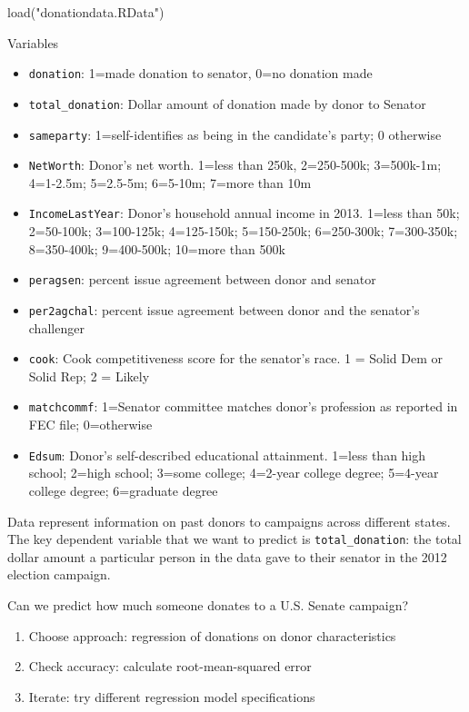 \documentclass[
  letterpaper,
  DIV=11,
  numbers=noendperiod]{scrreprt}
\newenvironment{Shaded}{\begin{snugshade}}{\end{snugshade}}
\newcommand{\FunctionTok}[1]{\textcolor[rgb]{0.28,0.35,0.67}{#1}}
\newcommand{\NormalTok}[1]{\textcolor[rgb]{0.00,0.23,0.31}{#1}}
\newcommand{\StringTok}[1]{\textcolor[rgb]{0.13,0.47,0.30}{#1}}
\providecommand{\tightlist}{%
  \setlength{\itemsep}{0pt}\setlength{\parskip}{0pt}}\usepackage{longtable,booktabs,array}
\begin{document}
\begin{Shaded}
\begin{Highlighting}[]
\FunctionTok{load}\NormalTok{(}\StringTok{"donationdata.RData"}\NormalTok{)}
\end{Highlighting}
\end{Shaded}

Variables

\begin{itemize}
\tightlist
\item
  \texttt{donation}: 1=made donation to senator, 0=no donation made
\item
  \texttt{total\_donation}: Dollar amount of donation made by donor to
  Senator
\item
  \texttt{sameparty}: 1=self-identifies as being in the candidate's
  party; 0 otherwise
\item
  \texttt{NetWorth}: Donor's net worth. 1=less than 250k, 2=250-500k;
  3=500k-1m; 4=1-2.5m; 5=2.5-5m; 6=5-10m; 7=more than 10m
\item
  \texttt{IncomeLastYear}: Donor's household annual income in 2013.
  1=less than 50k; 2=50-100k; 3=100-125k; 4=125-150k; 5=150-250k;
  6=250-300k; 7=300-350k; 8=350-400k; 9=400-500k; 10=more than 500k
\item
  \texttt{peragsen}: percent issue agreement between donor and senator
\item
  \texttt{per2agchal}: percent issue agreement between donor and the
  senator's challenger
\item
  \texttt{cook}: Cook competitiveness score for the senator's race. 1 =
  Solid Dem or Solid Rep; 2 = Likely
\item
  \texttt{matchcommf}: 1=Senator committee matches donor's profession as
  reported in FEC file; 0=otherwise
\item
  \texttt{Edsum}: Donor's self-described educational attainment. 1=less
  than high school; 2=high school; 3=some college; 4=2-year college
  degree; 5=4-year college degree; 6=graduate degree
\end{itemize}

Data represent information on past donors to campaigns across different
states. The key dependent variable that we want to predict is
\texttt{total\_donation}: the total dollar amount a particular person in
the data gave to their senator in the 2012 election campaign.

Can we predict how much someone donates to a U.S. Senate campaign?

\begin{enumerate}
\def\labelenumi{\arabic{enumi}.}
\tightlist
\item
  Choose approach: regression of donations on donor characteristics
\item
  Check accuracy: calculate root-mean-squared error
\item
  Iterate: try different regression model specifications
\end{enumerate}
\end{document}

